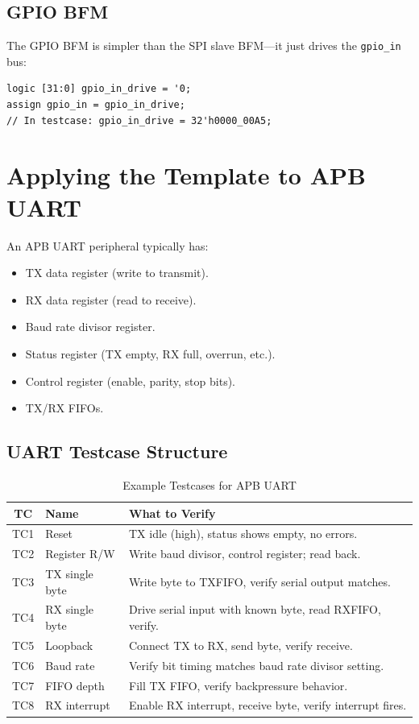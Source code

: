 \subsection{GPIO BFM}

The GPIO BFM is simpler than the SPI slave BFM---it just drives the \texttt{gpio\_in} bus:
\begin{lstlisting}
logic [31:0] gpio_in_drive = '0;
assign gpio_in = gpio_in_drive;
// In testcase: gpio_in_drive = 32'h0000_00A5;
\end{lstlisting}

\section{Applying the Template to APB UART}

An APB UART peripheral typically has:
\begin{itemize}[leftmargin=2em]
  \item TX data register (write to transmit).
  \item RX data register (read to receive).
  \item Baud rate divisor register.
  \item Status register (TX empty, RX full, overrun, etc.).
  \item Control register (enable, parity, stop bits).
  \item TX/RX FIFOs.
\end{itemize}

\subsection{UART Testcase Structure}

\begin{table}[H]
\centering
\caption{Example Testcases for APB UART}
\label{tab:uart_tc}
\begin{tabularx}{\textwidth}{@{}clX@{}}
\toprule
\textbf{TC} & \textbf{Name} & \textbf{What to Verify} \\
\midrule
TC1 & Reset & TX idle (high), status shows empty, no errors. \\
TC2 & Register R/W & Write baud divisor, control register; read back. \\
TC3 & TX single byte & Write byte to TXFIFO, verify serial output matches. \\
TC4 & RX single byte & Drive serial input with known byte, read RXFIFO, verify. \\
TC5 & Loopback & Connect TX to RX, send byte, verify receive. \\
TC6 & Baud rate & Verify bit timing matches baud rate divisor setting. \\
TC7 & FIFO depth & Fill TX FIFO, verify backpressure behavior. \\
TC8 & RX interrupt & Enable RX interrupt, receive byte, verify interrupt fires. \\
\bottomrule
\end{tabularx}
\end{table}

